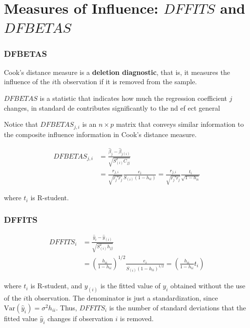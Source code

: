 \documentclass[12pt]{article}
\begin{document}
\section{Measures of Influence: $DFFITS$ and $DFBETAS$}


\subsubsection*{DFBETAS}

Cook's distance measure is a \textbf{deletion diagnostic}, that is, it measures the influence of the $i$th observation if it is removed from the sample.

$DFBETAS$ is a statistic that indicates how much the regression coefficient $j$ changes, in
standard de contributes significantly to the nd ef ect general

Notice that $DFBETAS_{j,i}$ is an $n \times p$ matrix that conveys similar information to the composite influence information in Cook’s distance measure.

$$
\begin{aligned}
DFBETAS_{j,i} &= \frac{\hat{\beta}_j - \hat{\beta}_{j(i)} } {\sqrt{S^2_{(i)} C_{jj} }  } \\[10pt]
&= \frac{r_{j,i}}{ \sqrt {r_j'r_j}  } \frac{e_i}{ S_{(i)} (1-h_{ii})} = \frac{r_{j,i}}{ \sqrt {r_j'r_j}  } \frac{t_i}{ \sqrt{1-h_{ii}}}
\end{aligned}
$$

where $t_i$ is R-student.


\subsubsection*{DFFITS}


$$
\begin{aligned}
DFFITS_i &= \frac{\hat{y}_i - \hat{y}_{(i)} } {\sqrt{S^2_{(i)} h_{jj} }  } \\[10pt]
&= \left( \frac{h_{ii}}{1 - h_{ii}} \right)^{1/2} \frac{e_i}{S_{(i)} ( 1- h_{ii})^{1/2}} = \left( \frac{h_{ii}}{1-h_{ii}} t_i \right)
\end{aligned}
$$

where $t_i$ is R-student, and $y_{(i)}$ is the fitted value of $y_i$ obtained without the use of the $i$th observation. The denominator is just a standardization, since $\mathrm{Var}(\hat{y}_i) = \sigma^2 h_{ii}$. Thus, $DFFITS_i$ is the number of standard deviations that the fitted value $\hat{y}_i$ changes if observation $i$ is removed.
\end{document}
